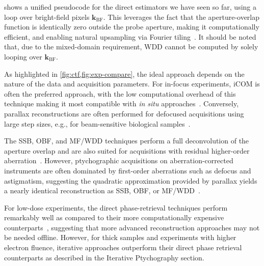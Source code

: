 \documentclass[pdflatex,sn-aps,iicol]{sn-jnl}%
\begin{document}
 shows a unified pseudocode for the direct estimators we have seen so far, using a loop over bright-field pixels $\boldsymbol{k}_{\mathrm{BF}}$.
This leverages the fact that the aperture-overlap function is identically zero outside the probe aperture, making it computationally efficient, and enabling natural upsampling via Fourier tiling~\cite{Varnavides_2025}.
It should be noted that, due to the mixed-domain requirement, WDD cannot be computed by solely looping over $\boldsymbol{k}_{\mathrm{BF}}$.

As highlighted in \cref{fig:ctf,fig:exp-compare}, the ideal approach depends on the nature of the data and acquisition parameters.
For in-focus experiments, iCOM is often the preferred approach, with the low computational overhead of this technique making it most compatible with \textit{in situ} approaches~\cite{bekkevold2024ultra}.
Conversely, parallax reconstructions are often performed for defocused acquisitions using large step sizes, e.g., for beam-sensitive biological samples~\cite{Berk_2024,Yu_2025}.

The SSB, OBF, and MF/WDD techniques perform a full deconvolution of the aperture overlap and are also suited for acquisitions with residual higher-order aberration~\cite{Varnavides_2025,Susi_2025}.
However, ptychographic acquisitions on aberration-corrected instruments are often dominated by first-order aberrations such as defocus and astigmatism, suggesting the quadratic approximation provided by parallax yields a nearly identical reconstruction as SSB, OBF, or MF/WDD~\cite{Varnavides_2025_ssnr}.

For low-dose experiments, the direct phase-retrieval techniques perform remarkably well as compared to their more computationally expensive counterparts~\cite{Varnavides_2025_ssnr}, suggesting that more advanced reconstruction approaches may not be needed offline.
However, for thick samples and experiments with higher electron fluence, iterative approaches outperform their direct phase retrieval counterparts as described in the Iterative Ptychography section.
\end{document}
